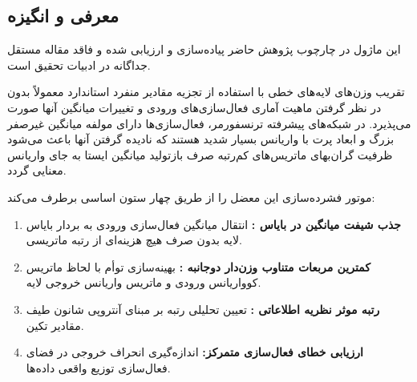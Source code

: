 \subsection{معرفی و انگیزه}
این ماژول در چارچوب پژوهش حاضر پیاده‌سازی و ارزیابی شده و فاقد مقاله مستقل جداگانه در ادبیات تحقیق است.

تقریب وزن‌های لایه‌های خطی با استفاده از تجزیه مقادیر منفرد  استاندارد معمولاً بدون در نظر گرفتن ماهیت آماری فعال‌سازی‌های ورودی و تغییرات میانگین آنها صورت می‌پذیرد. در شبکه‌های پیشرفته ترنسفورمر، فعال‌سازی‌ها دارای مولفه میانگین غیرصفر بزرگ  و ابعاد پرت با واریانس بسیار شدید هستند که نادیده گرفتن آنها باعث می‌شود ظرفیت گران‌بهای ماتریس‌های کم‌رتبه صرف بازتولید میانگین ایستا به جای واریانس معنایی گردد.

موتور فشرده‌سازی  این معضل را از طریق چهار ستون اساسی برطرف می‌کند:
\begin{enumerate}
\item \textbf{جذب شیفت میانگین در بایاس :} انتقال میانگین فعال‌سازی ورودی به بردار بایاس لایه بدون صرف هیچ هزینه‌ای از رتبه ماتریسی.
\item \textbf{کمترین مربعات متناوب وزن‌دار دوجانبه :} بهینه‌سازی توأم با لحاظ ماتریس کوواریانس ورودی و ماتریس واریانس خروجی لایه.
\item \textbf{رتبه موثر نظریه اطلاعاتی :} تعیین تحلیلی رتبه بر مبنای آنتروپی شانون طیف مقادیر تکین.
\item \textbf{ارزیابی خطای فعال‌سازی متمرکز:} اندازه‌گیری انحراف خروجی در فضای فعال‌سازی توزیع واقعی داده‌ها.
\end{enumerate}
